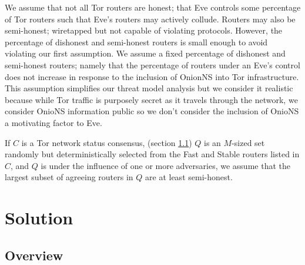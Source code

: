 \documentclass{sig-alternate}
\begin{document}
We assume that not all Tor routers are honest; that Eve controls some percentage of Tor routers such that Eve's routers may actively collude. Routers may also be semi-honest; wiretapped but not capable of violating protocols. However, the percentage of dishonest and semi-honest routers is small enough to avoid violating our first assumption. We assume a fixed percentage of dishonest and semi-honest routers; namely that the percentage of routers under an Eve's control does not increase in response to the inclusion of OnionNS into Tor infrastructure. This assumption simplifies our threat model analysis but we consider it realistic because while Tor traffic is purposely secret as it travels through the network, we consider OnioNS information public so we don't consider the inclusion of OnioNS a motivating factor to Eve.

If $ C $ is a Tor network status consensus, (section \ref{sec:SolutionOverview}) $ Q $ is an $ M $-sized set randomly but deterministically selected from the Fast and Stable routers listed in $ C $, and $ Q $ is under the influence of one or more adversaries, we assume that the largest subset of agreeing routers in $ Q $ are at least semi-honest.

\section{Solution}
\label{sec:Solution}

\subsection{Overview}
\label{sec:SolutionOverview}
\end{document}
